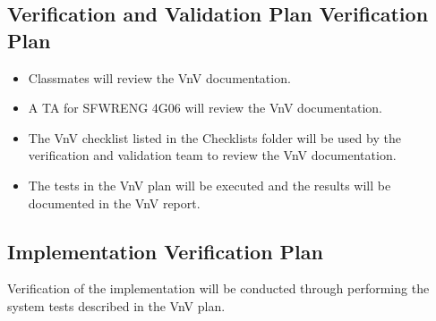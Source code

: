 \documentclass[12pt, titlepage]{article}
\begin{document}



\subsection{Verification and Validation Plan Verification Plan}

\begin{itemize}
    \item Classmates will review the VnV documentation.
    \item A TA for SFWRENG 4G06 will review the VnV documentation.
    \item The VnV checklist listed in the Checklists folder will be used by the verification and validation team to review the VnV documentation.
    \item The tests in the VnV plan will be executed and the results will be documented in the VnV report.
\end{itemize}






\subsection{Implementation Verification Plan}

Verification of the implementation will be conducted through performing the system tests described in the VnV plan.



\end{document}
